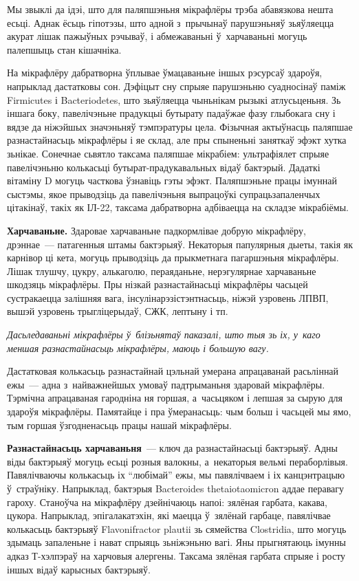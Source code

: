 Мы звыклі да ідэі, што для паляпшэньня мікрафлёры трэба абавязкова нешта есьці. Аднак ёсьць гіпотэзы, што адной з~прычынаў парушэньняў зьяўляецца акурат лішак пажыўных рэчываў, і абмежаваньні ў~харчаваньні могуць палепшыць стан кішачніка.

На мікрафлёру дабратворна ўплывае ўмацаваньне іншых рэсурсаў здароўя, напрыклад дастатковы сон. Дэфіцыт сну спрыяе парушэньню суадносінаў паміж Firmicutes і Bacteriodetes, што зьяўляецца чыньнікам рызыкі атлусьценьня. Зь іншага боку, павелічэньне прадукцыі бутырату падаўжае фазу глыбокага сну і вядзе да ніжэйшых значэньняў тэмпэратуры цела. Фізычная актыўнасць паляпшае разнастайнасьць мікрафлёры і яе склад, але пры спыненьні заняткаў эфэкт хутка зьнікае. Сонечнае сьвятло таксама паляпшае мікрабіем: ультрафіялет спрыяе павелічэньню колькасьці бутырат-прадукавальных відаў бактэрый. Дадаткі вітаміну D могуць часткова ўзнавіць гэты эфэкт. Паляпшэньне працы імуннай сыстэмы, якое прыводзіць да павелічэньня выпрацоўкі супрацьзапаленчых цітакінаў, такіх як ІЛ-22, таксама дабратворна адбіваецца на складзе мікрабіёмы.

\textbf{Харчаваньне.} Здаровае харчаваньне падкормлівае добрую мікрафлёру, дрэннае~--- патагенныя штамы бактэрыяў. Некаторыя папулярныя дыеты, такія як карнівор ці кета, могуць прыводзіць да прыкметнага пагаршэньня мікрафлёры. Лішак тлушчу, цукру, алькаголю, пераяданьне, нерэгулярнае харчаваньне шкодзяць мікрафлёры. Пры нізкай разнастайнасьці мікрафлёры часьцей сустракаецца залішняя вага, інсулінарэзістэнтнасьць, ніжэй узровень ЛПВП, вышэй узровень трыгліцерыдаў, СЖК, лептыну і тп.

\emph{Дасьледаваньні мікрафлёры ў~блізьнятаў паказалі, што тыя зь іх, у~каго меншая разнастайнасьць мікрафлёры, маюць і большую вагу.}

Дастатковая колькасьць разнастайнай цэльнай умерана апрацаванай расьліннай ежы~--- адна з~найважнейшых умоваў падтрыманьня здаровай мікрафлёры. Тэрмічна апрацаваная гародніна ня горшая, а~часьцяком і лепшая за сырую для здароўя мікрафлёры. Памятайце і пра ўмеранасьць: чым больш і часьцей мы ямо, тым горшая ўзгодненасьць працы нашай мікрафлёры.

\textbf{Разнастайнасьць харчаваньня}~--- ключ да разнастайнасьці бактэрыяў. Адны віды бактэрыяў могуць есьці розныя валокны, а~некаторыя вельмі пераборлівыя. Павялічваючы колькасьць іх ``любімай'' ежы, мы павялічваем і іх канцэнтрацыю ў~страўніку. Напрыклад, бактэрыя Bacteroides thetaiotaomicron аддае перавагу гароху. Станоўча на мікрафлёру дзейнічаюць напоі: зялёная гарбата, какава, цукора. Напрыклад, эпігалакатэхін, які маецца ў~зялёнай гарбаце, павялічвае колькасьць бактэрыяў Flavonifractor plautii зь сямейства Clostridia, што могуць здымаць запаленьне і нават спрыяць зьніжэньню вагі. Яны прыгнятаюць імунны адказ Т-хэлпэраў на харчовыя алергены. Таксама зялёная гарбата спрыяе і росту іншых відаў карысных бактэрыяў.

